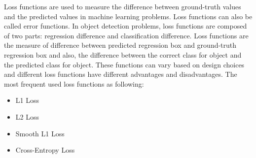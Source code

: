 \documentclass{article}
\begin{document}
\setlength{\parindent}{6ex}

\indent

Loss functions are used to measure the difference between ground-truth 
values and the predicted values in machine learning problems. Loss 
functions can also be called error functions. In object detection problems, 
loss functions are composed of two parts: regression difference and classification 
difference. Loss functions are the measure of difference between predicted 
regression box and ground-truth regression box and also, the difference between the 
correct class for object and the predicted class for object. These functions 
can vary based on design choices and different loss functions have different 
advantages and disadvantages. The most frequent used loss functions as 
following:
\begin{itemize}
    \item L1 Loss
    \item L2 Loss
    \item Smooth L1 Loss
    \item Cross-Entropy Loss
\end{itemize}    
\end{document}
